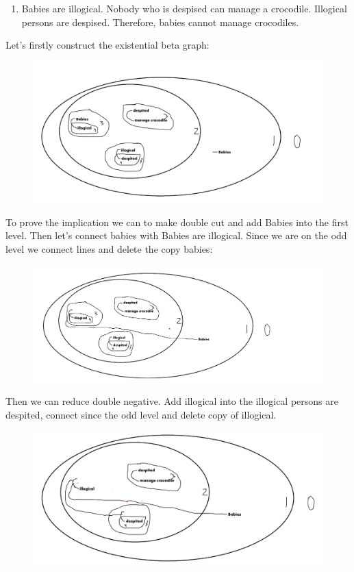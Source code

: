 \documentclass[12pt]{report}
\begin{document}
    \begin{problem}{}

        \begin{enumerate}
            \item Babies are illogical. Nobody who is despised can manage a crocodile. Illogical persons are despised. Therefore, babies cannot manage crocodiles.
        \end{enumerate}
    \end{problem}
    Let's firstly construct the existential beta graph:
    \begin{figure}[H]
        \center
        \includegraphics[scale=0.8]{p5a_1.png}
    \end{figure}
    To prove the implication we can to make double cut and add Babies into the first level. Then let's connect babies with Babies are illogical. Since we are on the odd level we connect lines and delete the copy babies:
    \begin{figure}[H]
        \center
        \includegraphics[scale=0.8]{p5a_2.png}
    \end{figure}
    Then we can reduce double negative. Add illogical into the illogical persons are despited, connect since the odd level and delete copy of illogical.
    \begin{figure}[H]
        \center
        \includegraphics[scale=0.8]{p5a_3.png}
    \end{figure}
\end{document}
